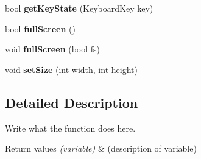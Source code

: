 \begin{DoxyCompactItemize}
\item 
\hypertarget{namespaceDisplay_a9de43ae19f6eaf993ed5ff826fbd5723}{bool {\bfseries get\+Key\+State} (Keyboard\+Key key)}\label{namespaceDisplay_a9de43ae19f6eaf993ed5ff826fbd5723}

\item 
\hypertarget{namespaceDisplay_a556d111fe1177a20bdaadb3ae589d9a8}{bool {\bfseries full\+Screen} ()}\label{namespaceDisplay_a556d111fe1177a20bdaadb3ae589d9a8}

\item 
\hypertarget{namespaceDisplay_a1b74a4469a6edd14a900922c59cc34c4}{void {\bfseries full\+Screen} (bool fs)}\label{namespaceDisplay_a1b74a4469a6edd14a900922c59cc34c4}

\item 
\hypertarget{namespaceDisplay_ae0adcedf815bfd1bd2686010e856d81c}{void {\bfseries set\+Size} (int width, int height)}\label{namespaceDisplay_ae0adcedf815bfd1bd2686010e856d81c}

\end{DoxyCompactItemize}


\subsection{Detailed Description}
Write what the function does here. 


\begin{DoxyRetVals}{Return values}
{\em (variable)} & (description of variable) \\
\hline
\end{DoxyRetVals}
